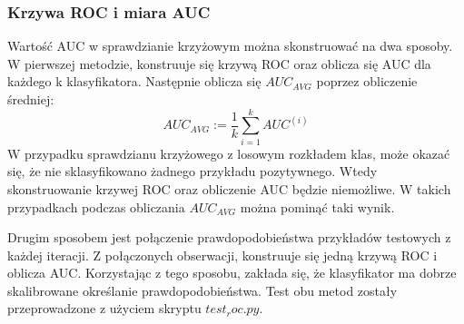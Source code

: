 \subsubsection{Krzywa ROC i miara AUC}
Wartość AUC w sprawdzianie krzyżowym można skonstruować na dwa sposoby. W pierwszej metodzie, konstruuje się krzywą ROC oraz oblicza się AUC dla każdego k klasyfikatora. Następnie oblicza się $AUC_{AVG}$ poprzez obliczenie średniej:
\[AUC_{AVG} := \frac{1}{k} \sum_{i=1}^{k} AUC^{(i)} \]
W przypadku sprawdzianu krzyżowego z losowym rozkładem klas, może okazać się, że nie sklasyfikowano żadnego przykładu pozytywnego. Wtedy skonstruowanie krzywej ROC oraz obliczenie AUC będzie niemożliwe. W takich przypadkach podczas obliczania $AUC_{AVG}$ można pominąć taki wynik. \par
Drugim sposobem jest połączenie prawdopodobieństwa przykładów testowych z każdej iteracji. Z połączonych obserwacji, konstruuje się jedną krzywą ROC i oblicza AUC. Korzystając z tego sposobu, zakłada się, że klasyfikator ma dobrze skalibrowane określanie prawdopodobieństwa. Test obu metod zostały przeprowadzone z użyciem skryptu $test_roc.py$.
